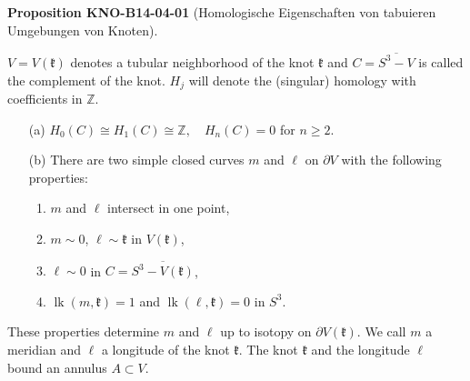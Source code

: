\documentclass[10pt, letterpaper]{article}
\newcommand{\CustomHeading}[3]{%
  \par\medskip\noindent%
  \textbf{#1 #2} \textnormal{(#3)}.\enskip%
}
\newenvironment{PROP}[2]{\CustomHeading{Proposition}{#1}{#2}}{}
\begin{document}
\begin{PROP}{KNO-B14-04-01}{Homologische Eigenschaften von tabuieren Umgebungen von Knoten}
$V=V(\mathfrak{k})$ denotes a tubular neighborhood of the knot $\mathfrak{k}$ and $C=\overline{S^{3}-V}$ is called the complement of the knot. $H_{j}$ will denote the (singular) homology with coefficients in $\mathbb{Z}$.

\begin{itemize}
  \item[(a)] \( H_{0}(C) \cong H_{1}(C) \cong \mathbb{Z}, \quad H_{n}(C) = 0 \) for \( n \geq 2 \).
  
  \item[(b)] There are two simple closed curves \( m \) and \( \ell \) on \( \partial V \) with the following properties:
  \begin{enumerate}
    \item \( m \) and \( \ell \) intersect in one point,
    \item \( m \sim 0 \), \( \ell \sim \mathfrak{k} \) in \( V(\mathfrak{k}) \),
    \item \( \ell \sim 0 \) in \( C = \overline{S^{3} - V(\mathfrak{k})} \),
    \item \( \operatorname{lk}(m, \mathfrak{k}) = 1 \) and \( \operatorname{lk}(\ell, \mathfrak{k}) = 0 \) in \( S^{3} \).
  \end{enumerate}
\end{itemize}

These properties determine $m$ and $\ell$ up to isotopy on $\partial V(\mathfrak{k})$. We call $m$ a meridian and $\ell$ a longitude of the knot $\mathfrak{k}$. The knot $\mathfrak{k}$ and the longitude $\ell$ bound an annulus $A \subset V$.
\end{PROP}
\end{document}
